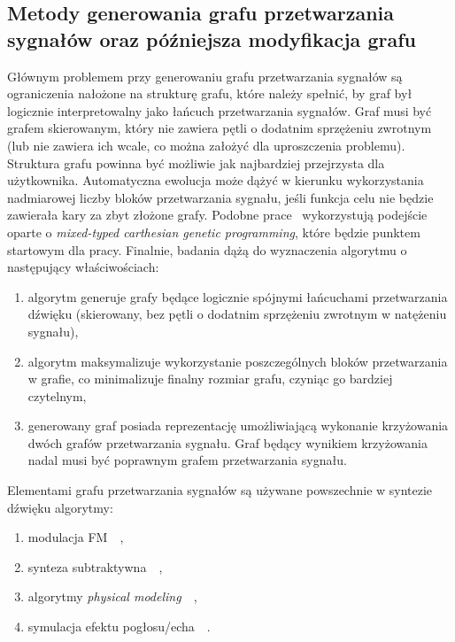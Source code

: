 \subsection{Metody generowania grafu przetwarzania sygnałów oraz późniejsza modyfikacja grafu}

Głównym problemem przy generowaniu grafu przetwarzania sygnałów są ograniczenia nałożone na strukturę grafu,
które należy spełnić, by graf był logicznie interpretowalny jako łańcuch przetwarzania sygnałów.
Graf musi być grafem skierowanym, który nie zawiera pętli o dodatnim sprzężeniu zwrotnym 
(lub nie zawiera ich wcale, co można założyć dla uproszczenia problemu).
Struktura grafu powinna być możliwie jak najbardziej przejrzysta dla użytkownika. 
Automatyczna ewolucja może dążyć w kierunku wykorzystania nadmiarowej liczby
bloków przetwarzania sygnału, jeśli funkcja celu nie będzie zawierała kary za zbyt złożone grafy.
Podobne prace~\cite{evolutionary_puredata} wykorzystują podejście oparte o 
\textit{mixed-typed carthesian genetic programming}, które będzie punktem startowym dla pracy.
Finalnie, badania dążą do wyznaczenia algorytmu o następujący właściwościach:

\begin{enumerate}
    \item algorytm generuje grafy będące logicznie spójnymi łańcuchami przetwarzania dźwięku (skierowany, bez pętli o dodatnim sprzężeniu zwrotnym w natężeniu sygnału),
    \item algorytm maksymalizuje wykorzystanie poszczególnych bloków przetwarzania w grafie, co minimalizuje finalny rozmiar grafu, czyniąc go bardziej czytelnym,
    \item generowany graf posiada reprezentację umożliwiającą wykonanie krzyżowania dwóch grafów przetwarzania sygnału. Graf będący wynikiem krzyżowania nadal musi być poprawnym grafem przetwarzania sygnału.
\end{enumerate}

Elementami grafu przetwarzania sygnałów są używane powszechnie w syntezie dźwięku algorytmy:

\begin{enumerate}
  \item modulacja FM~\cite{spectral_audio_processing}~\cite{computational_music_synthesis},
  \item synteza subtraktywna~\cite{computational_music_synthesis}~\cite{digital_filters},
  \item algorytmy \textit{physical modeling}~\cite{lisp_synthesis}~\cite{computational_music_synthesis},
  \item symulacja efektu pogłosu/echa~\cite{reverb}~\cite{freeverb}.
\end{enumerate}


